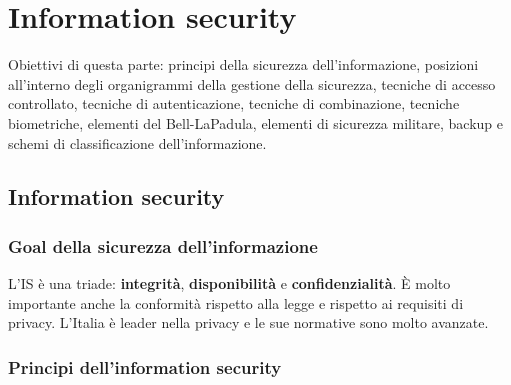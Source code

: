 \part{Information security}
Obiettivi di questa parte:
principi della sicurezza dell'informazione, posizioni all'interno
degli organigrammi della gestione della sicurezza, tecniche di accesso
controllato, tecniche di autenticazione, tecniche di combinazione,
tecniche biometriche, elementi del Bell-LaPadula, elementi di sicurezza
militare, backup e schemi di classificazione dell'informazione.

\chapter{Information security}
\label{cap:infoSec}
\section{Goal della sicurezza dell'informazione}

L'IS è una triade: \textbf{integrità}, \textbf{disponibilità} e
\textbf{confidenzialità}. È molto importante anche la conformità rispetto alla
legge e rispetto ai requisiti di privacy. L'Italia è leader nella privacy e le
sue normative sono molto avanzate.


\section{Principi dell'information security}

